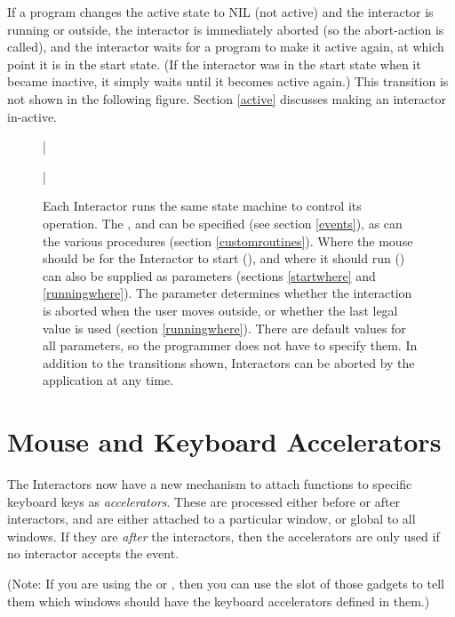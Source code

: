 If a program changes the active state to NIL (not active) and the
interactor is running or outside, the interactor is immediately aborted (so
the abort-action is called), and the interactor waits for a program to make
it active again, at which point it is in the start state.  (If the
interactor was in the start state when it became inactive, it simply waits
until it becomes active again.)  This transition is not shown in the
following figure.  Section \ref{active} discusses making an interactor in-active.

\begin{figure}
\bar{}
\begin{center}
\end{center}
\caption{Each Interactor runs the same state machine to control its operation.
The ,  and  can be
specified (see section \ref{events}), as can the various
 procedures (section \ref{customroutines}).  Where the mouse
should be for the Interactor to
start (), and where it should run () can
also be supplied as parameters (sections \ref{startwhere} and
\ref{runningwhere}).  The  parameter
determines whether the interaction is aborted when the user moves outside,
or whether the last legal value is used (section \ref{runningwhere}).
There are default values for all parameters, so the programmer does not
have to specify them.  In addition to the transitions shown, Interactors
can be aborted by the application at any time.}
\bar{}
\end{figure}


\chapter{Mouse and Keyboard Accelerators}
\label{accelerators-sec}

The Interactors now have a new mechanism to attach functions to
specific keyboard keys as {\it accelerators}.  These are processed
either before or after interactors, and are either attached to a
particular window, or global to all windows.  If they are {\it after} the
interactors, then the accelerators are only used if no interactor
accepts the event.

(Note: If you are using the  or , then
you can use the slot  of those gadgets to
tell them which windows should have the keyboard accelerators defined
in them.)

